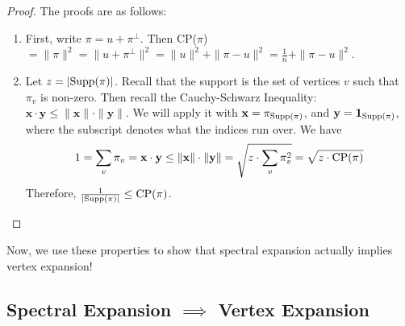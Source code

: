\documentclass[11pt]{article}
\theoremstyle{definition}
\theoremstyle{definition}
\theoremstyle{definition}
\newcommand{\txt}[1]
{\textnormal{#1}}
\begin{document}
\begin{proof}
The proofs are as follows: 
\begin{enumerate}

\item First, write $\pi = u + \pi^{\perp}$. Then CP($\pi$) $ = \|\pi\|^2 = \|u + \pi^{\perp}\|^2 = \|u\|^2 + \|\pi - u\|^2 = \frac{1}{n} + \|\pi - u\|^2$. 

\item Let $z = |\txt{Supp}(\pi)|$. Recall that the support is the set of vertices $v$ such that $\pi_v$ is non-zero. Then recall the Cauchy-Schwarz Inequality: $\textbf{x} \cdot \textbf{y} \leq \|\textbf{x}\|\cdot\|\textbf{y}\|$. We will apply it with $\textbf{x} = \pi_{\txt{Supp}(\pi)}$, and $\textbf{y} = \textbf{1}_{\txt{Supp}(\pi)}$, where the subscript denotes what the indices run over. We have 
\[
1 = \sum_v \pi_v = \textbf{x} \cdot \textbf{y} \leq \|\textbf{x}\| \cdot \|\textbf{y}\| = \sqrt{z \cdot \sum_v \pi_v^2} = \sqrt{z\cdot \txt{CP}(\pi)}
\]
Therefore, $\frac{1}{|\txt{Supp}(\pi)|} \leq \txt{CP}(\pi)$. 

\end{enumerate}
\end{proof}

Now, we use these properties to show that spectral expansion actually implies vertex expansion!

\subsection{Spectral Expansion $\implies$ Vertex Expansion}
\end{document}
